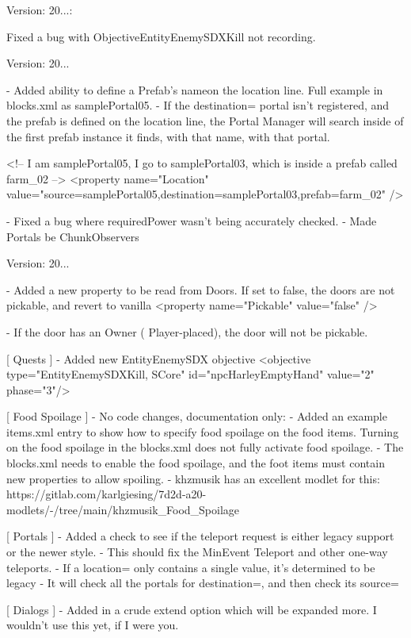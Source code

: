 Version\+: 20...\+: \begin{DoxyVerb}[ Quests ]
    Fixed a bug with ObjectiveEntityEnemySDXKill not recording.
\end{DoxyVerb}
 Version\+: 20... \begin{DoxyVerb}[ Portals ]
    - Added ability to define a Prefab's nameon the location line. Full example in blocks.xml as samplePortal05.
    - If the destination= portal isn't registered, and the prefab is defined on the location line, the Portal Manager
        will search inside of the first prefab instance it finds, with that name, with that portal.

        <!-- I am samplePortal05, I go to samplePortal03, which is inside a prefab called farm_02 -->
        <property name="Location" value="source=samplePortal05,destination=samplePortal03,prefab=farm_02" />

    - Fixed a bug where requiredPower wasn't being accurately checked.
    - Made Portals be ChunkObservers
\end{DoxyVerb}
 Version\+: 20... \begin{DoxyVerb}
    - Added a new property to be read from Doors. If set to false, the doors are not pickable, and revert to vanilla
        <property name="Pickable" value="false" />

    - If the door has an Owner ( Player-placed), the door will not be pickable.

[ Quests ]
    - Added new EntityEnemySDX objective
        <objective type="EntityEnemySDXKill, SCore" id="npcHarleyEmptyHand" value="2" phase="3"/>

[ Food Spoilage ]
    - No code changes, documentation only:
        - Added an example items.xml entry to show how to specify food spoilage on the food items. Turning on the food spoilage in the blocks.xml does not fully activate food spoilage.
        - The blocks.xml needs to enable the food spoilage, and the foot items must contain new properties to allow spoiling.
        - khzmusik has an excellent modlet for this: https://gitlab.com/karlgiesing/7d2d-a20-modlets/-/tree/main/khzmusik_Food_Spoilage

[ Portals ]
    - Added a check to see if the teleport request is either legacy support or the newer style.
        - This should fix the MinEvent Teleport and other one-way teleports.
        - If a location= only contains a single value, it's determined to be legacy
        - It will check all the portals for destination=, and then check its source=

[ Dialogs ]
    - Added in a crude extend option which will be expanded more. I wouldn't use this yet, if I were you.
\end{DoxyVerb}
